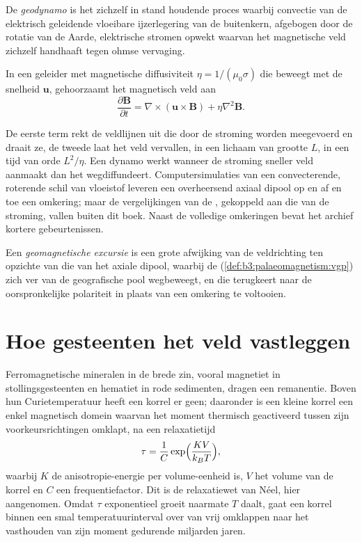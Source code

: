 \begin{definition}[Geodynamo]\label{def:b3:palaeomagnetism:geodynamo}
De \emph{geodynamo} is het zichzelf in stand houdende proces waarbij
convectie van de elektrisch geleidende vloeibare ijzerlegering van de buitenkern,
afgebogen door de rotatie van de Aarde, elektrische stromen opwekt waarvan het
magnetische veld zichzelf handhaaft tegen ohmse vervaging.
\end{definition}

\begin{proposition}[Inductievergelijking]\label{prop:b3:palaeomagnetism:induction}
In een geleider met magnetische diffusiviteit $\eta = 1/(\mu_0\sigma)$ die beweegt met de
snelheid $\mathbf u$, gehoorzaamt het magnetisch veld aan
\[
  \frac{\partial\mathbf B}{\partial t} = \nabla\times(\mathbf u\times\mathbf B)
  + \eta\nabla^2\mathbf B .
\]
\end{proposition}
\admitted

De eerste term rekt de veldlijnen uit die door de stroming worden meegevoerd en draait ze, de
tweede laat het veld vervallen, in een lichaam van grootte $L$, in een tijd van orde
$L^2/\eta$. Een dynamo werkt wanneer de stroming sneller veld aanmaakt dan het
wegdiffundeert. Computersimulaties van een convecterende, roterende schil van vloeistof
leveren een overheersend axiaal dipool op en af en toe een omkering; maar de
vergelijkingen van de , gekoppeld aan die van de stroming, vallen buiten dit
boek. Naast de volledige omkeringen bevat het archief kortere gebeurtenissen.

\begin{definition}\label{def:b3:palaeomagnetism:excursion}
Een \emph{geomagnetische excursie} is een grote
afwijking van de veldrichting ten opzichte van die van het axiale dipool, waarbij de
 (\cref{def:b3:palaeomagnetism:vgp}) zich ver van
de geografische pool wegbeweegt, en die terugkeert naar de oorspronkelijke polariteit in plaats van
een omkering te voltooien.
\end{definition}

\section{Hoe gesteenten het veld vastleggen}

Ferromagnetische mineralen in de brede zin, vooral magnetiet in stollingsgesteenten en
hematiet in rode sedimenten, dragen een remanentie. Boven hun Curietemperatuur heeft een
korrel er geen; daaronder is een kleine korrel een enkel magnetisch domein waarvan het
moment thermisch geactiveerd tussen zijn voorkeursrichtingen omklapt, na een
relaxatietijd
\[
  \tau = \frac1C\exp\Bigl(\frac{K V}{k_B T}\Bigr),
\]
waarbij $K$ de anisotropie-energie per volume-eenheid is, $V$ het volume van de korrel
en $C$ een frequentiefactor. Dit is de relaxatiewet van Néel, hier aangenomen. Omdat
$\tau$ exponentieel groeit naarmate $T$ daalt, gaat een korrel binnen een smal temperatuurinterval
over van vrij omklappen naar het vasthouden van zijn moment gedurende miljarden
jaren.

